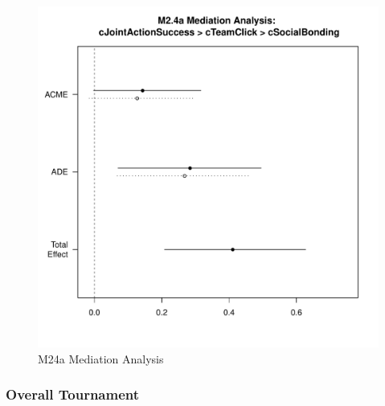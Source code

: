 {      
      \begin{figure}[htbp]
        \centering
        \includegraphics[scale=.5]{images/MLM24aMediationAnalysis.pdf}
        \caption{M24a Mediation Analysis}
        \label{fig:MLM24aMediationAnalysis}
      \end{figure}

      \subsubsection{Overall Tournament}


}
